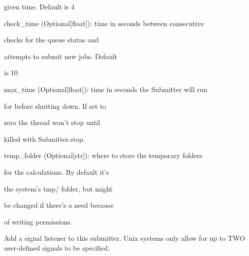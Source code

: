\documentclass[letterpaper,10pt,english]{sphinxmanual}
\begin{document}
\begin{fulllineitems}
\begin{DUlineblock}{0em}
\begin{DUlineblock}{\DUlineblockindent}
\begin{DUlineblock}{\DUlineblockindent}
\item[] given time. Default is 4
\end{DUlineblock}
\item[] check\_time (Optional{[}float{]}): time in seconds between consecutive
\item[]
\begin{DUlineblock}{\DUlineblockindent}
\item[] checks for the queue status and
\item[] attempts to submit new jobs. Default
\item[] is 10
\end{DUlineblock}
\item[] max\_time (Optional{[}float{]}): time in seconds the Submitter will run
\item[]
\begin{DUlineblock}{\DUlineblockindent}
\item[] for before shutting down. If set to
\item[] zero the thread won't stop until
\item[] killed with Submitter.stop.
\end{DUlineblock}
\item[] temp\_folder (Optional{[}str{]}): where to store the temporary folders
\item[]
\begin{DUlineblock}{\DUlineblockindent}
\item[] for the calculations. By default it's
\item[] the system's tmp/ folder, but might
\item[] be changed if there's a need because
\item[] of writing permissions.
\end{DUlineblock}
\end{DUlineblock}
\end{DUlineblock}

\begin{fulllineitems}
\label{doctree/soprano.hpc.submitter.submit:soprano.hpc.submitter.submit.Submitter.add_signal}
Add a signal listener to this submitter. Unix systems only allow
for up to TWO user-defined signals to be specified.


\end{fulllineitems}
\end{fulllineitems}
\end{document}
